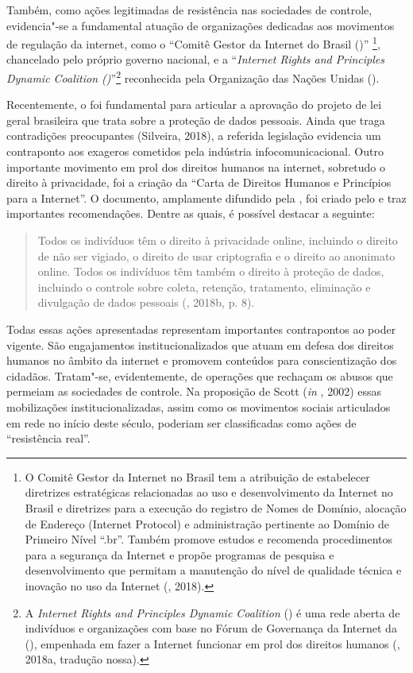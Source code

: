 Também, como ações legitimadas de resistência nas sociedades de
controle, evidencia"-se a fundamental atuação de organizações dedicadas
aos movimentos de regulação da internet, como o ``Comitê Gestor da
Internet do Brasil ()'' \footnote{O Comitê Gestor da Internet no
  Brasil tem a atribuição de estabelecer diretrizes estratégicas
  relacionadas ao uso e desenvolvimento da Internet no Brasil e
  diretrizes para a execução do registro de Nomes de Domínio, alocação
  de Endereço  (Internet Protocol) e administração pertinente ao
  Domínio de Primeiro Nível ``.br''. Também promove estudos e recomenda
  procedimentos para a segurança da Internet e propõe programas de
  pesquisa e desenvolvimento que permitam a manutenção do nível de
  qualidade técnica e inovação no uso da Internet (, 2018).},
chancelado pelo próprio governo nacional, e a ``\emph{Internet Rights
and Principles Dynamic Coalition ()}''\footnote{A \emph{Internet
  Rights and Principles Dynamic Coalition} () é uma rede aberta de
  indivíduos e organizações com base no Fórum de Governança da Internet
  da  (), empenhada em fazer a Internet funcionar em prol dos
  direitos humanos (, 2018a, tradução nossa).} reconhecida pela Organização das Nações Unidas ().

Recentemente, o  foi fundamental para articular a aprovação do
projeto de lei geral brasileira que trata sobre a proteção de dados
pessoais. Ainda que traga contradições preocupantes (Silveira, 2018), a
referida legislação evidencia um contraponto aos exageros cometidos pela
indústria infocomunicacional. Outro importante movimento em prol dos
direitos humanos na internet, sobretudo o direito à privacidade, foi a
criação da ``Carta de Direitos Humanos e Princípios para a Internet''. O
documento, amplamente difundido pela , foi criado pelo  e traz
importantes recomendações. Dentre as quais, é possível destacar a
seguinte:

\begin{quote}
Todos os indivíduos têm o direito à privacidade online, incluindo o
direito de não ser vigiado, o direito de usar criptografia e o direito
ao anonimato online. Todos os indivíduos têm também o direito à proteção
de dados, incluindo o controle sobre coleta, retenção, tratamento,
eliminação e divulgação de dados pessoais (, 2018b, p. 8).
\end{quote}

Todas essas ações apresentadas representam importantes contrapontos ao
poder vigente. São engajamentos institucionalizados que atuam em defesa
dos direitos humanos no âmbito da internet e promovem conteúdos para
conscientização dos cidadãos. Tratam"-se, evidentemente, de operações que
rechaçam os abusos que permeiam as sociedades de controle. Na proposição
de Scott (\emph{in} , 2002) essas mobilizações
institucionalizadas, assim como os movimentos sociais articulados em
rede no início deste século, poderiam ser classificadas como ações de
``resistência real''.

